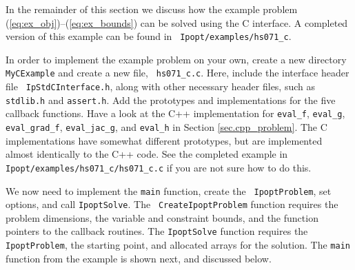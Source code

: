 \documentclass[10pt]{article}
\newcommand{\Ipopt}{{\sc Ipopt}}
\begin{document}
In the remainder of this section we discuss how the example problem
(\ref{eq:ex_obj})--(\ref{eq:ex_bounds}) can be solved using the C
interface.  A completed version of this example can be found in {\tt
  Ipopt/examples/hs071\_c}.


\vspace{\baselineskip}

In order to implement the example problem on your own, create a new
directory {\tt MyCExample} and create a new file, {\tt
  hs071\_c.c}.  Here, include the interface header file {\tt
  IpStdCInterface.h}, along with other necessary header files, such as
{\tt stdlib.h} and {\tt assert.h}.  Add the prototypes and
implementations for the five callback functions.  Have a look at the
C++ implementation for {\tt eval\_f}, {\tt eval\_g}, {\tt
  eval\_grad\_f}, {\tt eval\_jac\_g}, and {\tt eval\_h} in Section
\ref{sec.cpp_problem}. The C implementations have somewhat different
prototypes, but are implemented almost identically to the C++ code.
See the completed example in {\tt Ipopt/examples/hs071\_c/hs071\_c.c} if you
are not sure how to do this.

We now need to implement the {\tt main} function, create the {\tt
  IpoptProblem}, set options, and call {\tt IpoptSolve}. The {\tt
  CreateIpoptProblem} function requires the problem dimensions, the
variable and constraint bounds, and the function pointers to the
callback routines. The {\tt IpoptSolve} function requires the {\tt
  IpoptProblem}, the starting point, and allocated arrays for the
solution.  The {\tt main} function from the example is shown next, and
discussed below.
\end{document}
